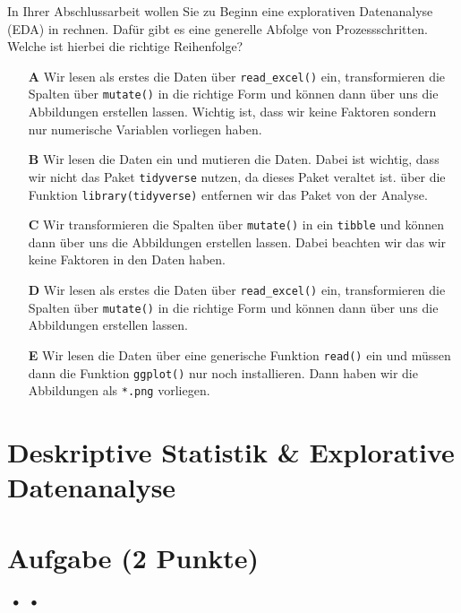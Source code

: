 \documentclass[a4paper, 9pt]{scrartcl}\usepackage[]{graphicx}\usepackage[]{xcolor}
\begin{document}
In Ihrer Abschlussarbeit wollen Sie zu Beginn eine explorativen Datenanalyse (EDA) in \Rlogo rechnen. Dafür gibt es eine generelle Abfolge von Prozessschritten. Welche ist hierbei die richtige Reihenfolge?



\begin{enumerate}
\item [\textbf{A} \msquare] Wir lesen als erstes die Daten über \texttt{read\_excel()} ein, transformieren die Spalten über \texttt{mutate()} in die richtige Form und können dann  über  uns die Abbildungen erstellen lassen. Wichtig ist, dass wir keine Faktoren sondern nur numerische Variablen vorliegen haben.
\item [\textbf{B} \msquare] Wir lesen die Daten ein und mutieren die Daten. Dabei ist wichtig, dass wir nicht das Paket \texttt{tidyverse} nutzen, da dieses Paket veraltet ist. über die Funktion \texttt{library(tidyverse)} entfernen wir das Paket von der Analyse.
\item [\textbf{C} \msquare] Wir transformieren die Spalten über \texttt{mutate()} in ein \texttt{tibble} und können dann über  uns die Abbildungen erstellen lassen. Dabei beachten wir das wir keine Faktoren in den Daten haben.
\item [\textbf{D} \msquare] Wir lesen als erstes die Daten über \texttt{read\_excel()} ein, transformieren die Spalten über \texttt{mutate()} in die richtige Form und können dann über  uns die Abbildungen erstellen lassen.
\item [\textbf{E} \msquare] Wir lesen die Daten über eine generische Funktion \texttt{read()} ein und müssen dann die Funktion \texttt{ggplot()} nur noch installieren. Dann haben wir die Abbildungen als \texttt{*.png} vorliegen.
\end{enumerate} 
\section*{Deskriptive Statistik \& Explorative Datenanalyse}

\section{Aufgabe \hfill (2 Punkte)}

\ifcollection
\begin{flushright}
\tiny\vspace{-2Ex}
\textbf{\examinhaltstart}
\exammodulemathstat $\;\bullet$
\exammodulestat $\;\bullet$
\exammodulestatbbv 
\vspace{-1Ex}
\end{flushright}
\fi
\end{document}
